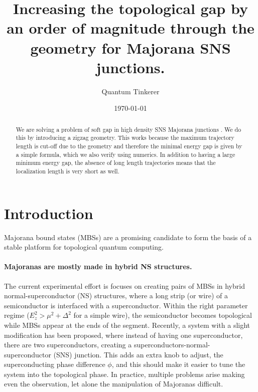 \documentclass[english, twocolumn, 10pt, aps, superscriptaddress, floatfix, prb, citeautoscript]{revtex4-1}
\renewcommand{\comment}[2]{#2}
\renewcommand{\comment}{\paragraph}
\begin{document}
\title{Increasing the topological gap by an order of magnitude through the geometry for Majorana SNS junctions.}

\author{Quantum Tinkerer}

\date{\today}
\begin{abstract}
We are solving a problem of soft gap in high density SNS Majorana junctions \cite{pientka2017topological}.
We do this by introducing a zigzag geometry.
This works because the maximum trajectory length is cut-off due to the geometry and therefore the minimal energy gap is given by a simple formula, which we also verify using numerics.
In addition to having a large minimum energy gap, the absence of long length trajectories means that the localization length is very short as well.
\end{abstract}

\maketitle

\section{Introduction}
Majorana bound states (MBSs) are a promising candidate to form the basis of a stable platform for topological quantum computing.

\comment{Majoranas are mostly made in hybrid NS structures.}
The current experimental effort is focuses on creating pairs of MBSs in hybrid normal-superconductor (NS) structures, where a long strip (or wire) of a semiconductor is interfaced with a \cite{lutchyn_majorana_2010,oreg_helical_2010} superconductor.
Within the right parameter regime ($E_z^2>\mu^2+\Delta^2$ for a simple wire), the semiconductor becomes topological while MBSs appear at the ends of the segment.
Recently, a system with a slight modification has been proposed\cite{pientka2017topological}, where instead of having one superconductor, there are two superconductors, creating a superconductors-normal-superconductor (SNS) junction.
This adds an extra knob to adjust, the superconducting phase difference $\phi$, and this should make it easier to tune the system into the topological phase.
In practice, multiple problems arise making even the observation, let alone the manipulation of Majoranas difficult.
\end{document}
